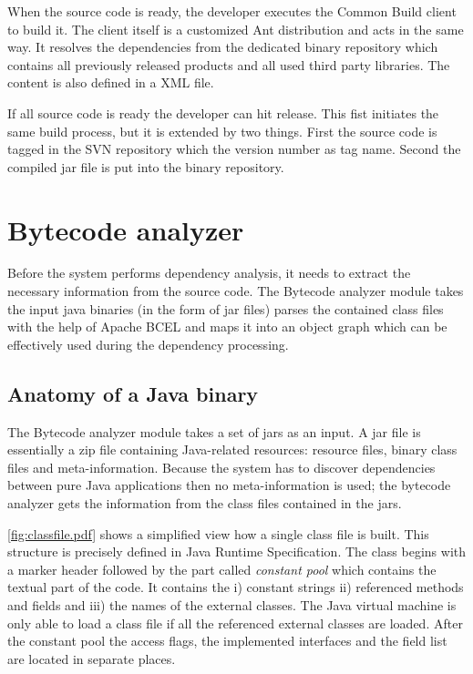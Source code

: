 When the source code is ready, the developer executes the Common Build client to
build it. The client itself is a customized Ant distribution and acts in the
same way. It resolves the dependencies from the dedicated binary repository
which contains all previously released products and all used third party
libraries. The content is also defined in a XML file.

If all source code is ready the developer can hit release. This fist initiates
the same build process, but it is extended by two things. First the source code
is tagged in the SVN repository which the version number as tag name. Second the
compiled jar file is put into the binary repository. 

\section{Bytecode analyzer}
Before the system performs dependency analysis, it needs to extract the
necessary information from the source code.
The Bytecode analyzer module takes the input java binaries (in the form of jar
files) parses the contained class files with the help of Apache BCEL and maps it
into an object graph which can be effectively used during the dependency
processing.


\subsection{Anatomy of a Java binary}
The Bytecode analyzer module takes a set of jars as an input. A jar file is
essentially a zip file containing Java-related resources: resource files, binary
class files and meta-information. Because the system has to discover
dependencies between pure Java applications then no meta-information is used;
the bytecode analyzer gets the information from the class files contained in the
jars.
 

\autoref{fig:classfile.pdf} shows a simplified view how a single class
file is built. This structure is precisely defined in Java Runtime
Specification. The class begins with a marker header followed by the part called
\textit{constant pool} which contains the textual part of the code. It contains
the i) constant strings ii) referenced methods and fields and iii) the names of
the external classes. The Java virtual machine is only able to load a class file
if all the referenced external classes are loaded.
After the constant pool the access flags, the implemented interfaces and the
field list are located in separate places.

